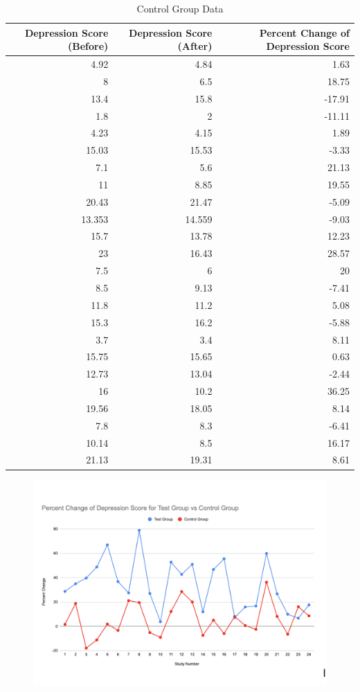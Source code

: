 \documentclass[12pt]{article}
\begin{document}
  
  \begin{table}[hbt!]
    \small
    \caption{Control Group Data}
    \label{tab:2}
  \centering
  \begin{tabular}{rrr}
      \toprule
  Depression Score (Before) & Depression Score (After) & Percent Change of Depression Score \\ 
    \midrule
     4.92 & 4.84 & 1.63\\ 
     8 & 6.5 & 18.75\\ 
     13.4 & 15.8 & -17.91\\ 
     1.8 & 2 & -11.11\\ 
     4.23 & 4.15 & 1.89\\ 
     15.03 & 15.53 & -3.33\\  
     7.1 & 5.6 & 21.13\\
     11 & 8.85 & 19.55\\
     20.43 & 21.47 & -5.09\\
     13.353 & 14.559 & -9.03\\
     15.7 & 13.78 & 12.23\\
     23 & 16.43 & 28.57\\
     7.5 & 6 & 20\\
     8.5 & 9.13 & -7.41\\
     11.8 & 11.2 & 5.08\\
     15.3 & 16.2 & -5.88\\
     3.7 & 3.4 & 8.11\\
     15.75 & 15.65 & 0.63\\
     12.73 & 13.04 & -2.44\\
     16 & 10.2 & 36.25\\
     19.56 & 18.05 & 8.14\\
     7.8 & 8.3 & -6.41\\
     10.14 & 8.5 & 16.17\\
     21.13 & 19.31 & 8.61\\
     \bottomrule
  \end{tabular}
  \end{table}

  \begin{figure}[hbt!]
    \centering
    \includegraphics[width=12 cm]{CHART1.png}
    \label{fig:chart1}
  \end{figure}
\end{document}
